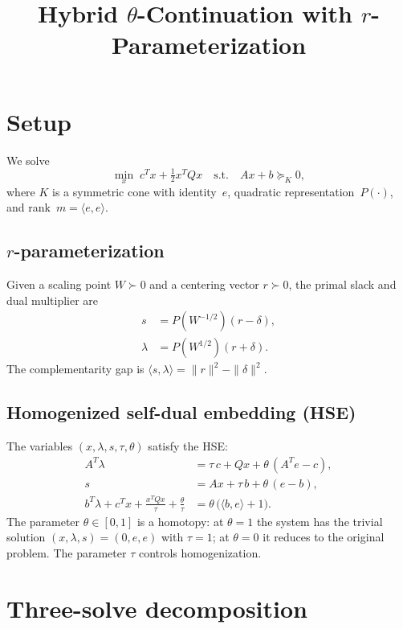 \documentclass{article}
\title{Hybrid $\theta$-Continuation with $r$-Parameterization}
\author{}
\date{}
\newcommand{\PW}{P(W^{1/2})}
\newcommand{\PiW}{P(W^{-1/2})}
\newcommand{\ip}[2]{\langle #1, #2 \rangle}
\begin{document}
\maketitle

\section{Setup}

We solve
\[
  \min_x\; c^T x + \tfrac{1}{2} x^T Q x
  \quad\text{s.t.}\quad Ax + b \succeq_K 0,
\]
where $K$ is a symmetric cone with identity~$e$, quadratic
representation~$P(\cdot)$, and rank~$m = \ip{e}{e}$.

\subsection{$r$-parameterization}

Given a scaling point $W \succ 0$ and a centering vector $r \succ 0$,
the primal slack and dual multiplier are
\begin{align}
  s &= \PiW(r - \delta), \label{eq:slack} \\
  \lambda &= \PW(r + \delta). \label{eq:dual}
\end{align}
The complementarity gap is
$\ip{s}{\lambda} = \|r\|^2 - \|\delta\|^2$.

\subsection{Homogenized self-dual embedding (HSE)}

The variables $(x, \lambda, s, \tau, \theta)$ satisfy the HSE:
\begin{align}
  A^T \lambda &= \tau\,c + Qx + \theta\,(A^T e - c), \label{eq:hse-dual}\\
  s &= Ax + \tau\,b + \theta\,(e - b), \label{eq:hse-primal}\\
  b^T \lambda + c^T x + \frac{x^T Q x}{\tau} + \frac{\theta}{\tau}
    &= \theta\,\bigl(\ip{b}{e} + 1\bigr). \label{eq:hse-gap}
\end{align}
The parameter $\theta \in [0,1]$ is a homotopy: at $\theta = 1$
the system has the trivial solution $(x, \lambda, s) = (0, e, e)$
with $\tau = 1$; at $\theta = 0$ it reduces to the original problem.
The parameter $\tau$ controls homogenization.

\section{Three-solve decomposition}
\end{document}
